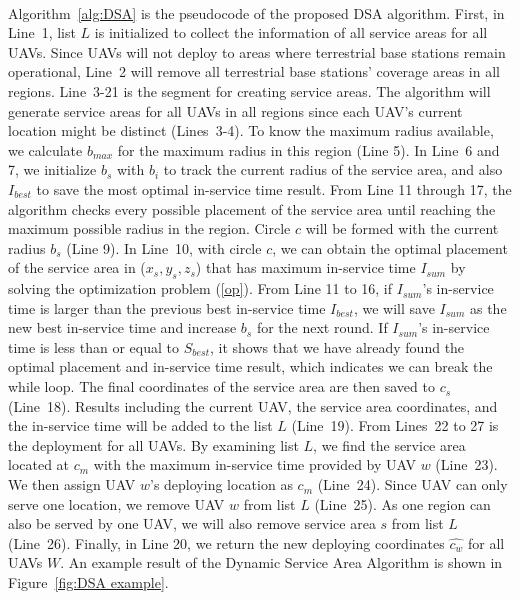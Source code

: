 \documentclass[a4paper,12pt]{report}
\begin{document}
\paragraph{}
Algorithm~\ref{alg:DSA} is the pseudocode of the proposed DSA algorithm. First, in Line~1, list $L$ is initialized to collect the information of all service areas for all UAVs. Since UAVs will not deploy to areas where terrestrial base stations remain operational, Line~2 will remove all terrestrial base stations' coverage areas in all regions. Line~3-21 is the segment for creating service areas. The algorithm will generate service areas for all UAVs in all regions since each UAV's current location might be distinct (Lines~3-4). To know the maximum radius available, we calculate $b_{max}$ for the maximum radius in this region (Line 5). In Line~6 and 7, we initialize $b_s$ with $b_i$ to track the current radius of the service area, and also $I_{best}$ to save the most optimal in-service time result. From Line 11 through 17, the algorithm checks every possible placement of the service area until reaching the maximum possible radius in the region. Circle $c$ will be formed with the current radius $b_s$ (Line 9). In Line~10, with circle $c$, we can obtain the optimal placement of the service area in ($x_s, y_s, z_s$) that has maximum in-service time $I_{sum}$ by solving the optimization problem (\ref{op}). From Line 11 to 16, if $I_{sum}$'s in-service time is larger than the previous best in-service time $I_{best}$, we will save $I_{sum}$ as the new best in-service time and increase $b_{s}$ for the next round. If $I_{sum}$'s in-service time is less than or equal to $S_{best}$, it shows that we have already found the optimal placement and in-service time result, which indicates we can break the while loop. The final coordinates of the service area are then saved to $c_s$ (Line~18). Results including the current UAV, the service area coordinates, and the in-service time will be added to the list $L$ (Line~19). From Lines~22 to 27 is the deployment for all UAVs. By examining list $L$, we find the service area located at $c_m$ with the maximum in-service time provided by UAV $w$ (Line~23). We then assign UAV $w$'s deploying location as $c_m$ (Line~24). Since UAV can only serve one location, we remove UAV $w$ from list $L$ (Line~25). As one region can also be served by one UAV, we will also remove service area $s$ from list $L$ (Line~26). Finally, in Line 20, we return the new deploying coordinates $\hat{c_{w}}$ for all UAVs $W$. An example result of the Dynamic Service Area Algorithm is shown in Figure~\ref{fig:DSA example}.
\end{document}
